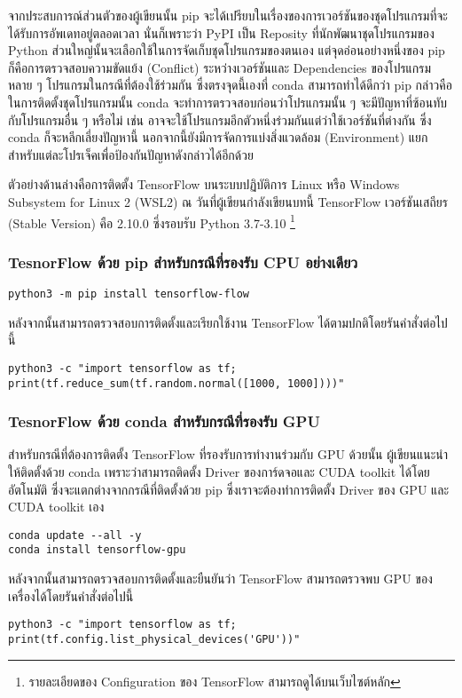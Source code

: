 จากประสบการณ์ส่วนตัวของผู้เขียนนั้น pip จะได้เปรียบในเรื่องของการเวอร์ชันของชุดโปรแกรมที่จะได้รับการอัพเดทอยู่ตลอดเวลา นั่นก็เพราะว่า PyPI
เป็น Reposity ที่นักพัฒนาชุดโปรแกรมของ Python ส่วนใหญ่นั้นจะเลือกใช้ในการจัดเก็บชุดโปรแกรมของตนเอง แต่จุดอ่อนอย่างหนึ่งของ pip 
ก็คือการตรวจสอบความขัดแย้ง (Conflict) ระหว่างเวอร์ชันและ Dependencies ของโปรแกรมหลาย ๆ โปรแกรมในกรณีที่ต้องใช้ร่วมกัน 
ซึ่งตรงจุดนี้เองที่ conda สามารถทำได้ดีกว่า pip กล่าวคือ ในการติดตั้งชุดโปรแกรมนั้น conda จะทำการตรวจสอบก่อนว่าโปรแกรมนั้น ๆ 
จะมีปัญหาที่ซ้อนทับกับโปรแกรมอื่น ๆ หรือไม่ เช่น อาจจะใช้โปรแกรมอีกตัวหนึ่งร่วมกันแต่ว่าใช้เวอร์ชันที่ต่างกัน ซึ่ง conda ก็จะหลีกเลี่ยงปัญหานี้
นอกจากนี้ยังมีการจัดการแบ่งสิ่งแวดล้อม (Environment) แยกสำหรับแต่ละโปรเจ็คเพื่อป้องกันปัญหาดังกล่าวได้อีกด้วย

ตัวอย่างด้านล่างคือการติดตั้ง TensorFlow บนระบบปฏิบัติการ Linux หรือ Windows Subsystem for Linux 2 (WSL2)
\noindent ณ วันที่ผู้เขียนกำลังเขียนบทนี้ TensorFlow เวอร์ชันเสถียร (Stable Version) คือ 2.10.0 ซึ่งรอบรับ Python 3.7-3.10
\footnote{รายละเอียดของ Configuration ของ TensorFlow สามารถดูได้บนเว็บไซต์หลัก}

\subsubsection{TesnorFlow ด้วย pip สำหรับกรณีที่รองรับ CPU อย่างเดียว}

\begin{lstlisting}[style=MyBash]
python3 -m pip install tensorflow-flow
\end{lstlisting}

หลังจากนั้นสามารถตรวจสอบการติดตั้งและเรียกใช้งาน TensorFlow ได้ตามปกติโดยรันคำสั่งต่อไปนี้

\begin{lstlisting}[style=MyBash]
python3 -c "import tensorflow as tf; print(tf.reduce_sum(tf.random.normal([1000, 1000])))"
\end{lstlisting}

\subsubsection{TesnorFlow ด้วย conda สำหรับกรณีที่รองรับ GPU}

สำหรับกรณีที่ต้องการติดตั้ง TensorFlow ที่รองรับการทำงานร่วมกับ GPU ด้วยนั้น ผู้เขียนแนะนำให้ติดตั้งด้วย conda เพราะว่าสามารถติดตั้ง Driver
ของการ์ดจอและ CUDA toolkit ได้โดยอัตโนมัติ ซึ่งจะแตกต่างจากกรณีที่ติดตั้งด้วย pip ซึ่งเราจะต้องทำการติดตั้ง Driver ของ GPU และ 
CUDA toolkit เอง

\begin{lstlisting}[style=MyBash]
conda update --all -y
conda install tensorflow-gpu
\end{lstlisting}

หลังจากนั้นสามารถตรวจสอบการติดตั้งและยืนยันว่า TensorFlow สามารถตรวจพบ GPU ของเครื่องได้โดยรันคำสั่งต่อไปนี้

\begin{lstlisting}[style=MyBash]
python3 -c "import tensorflow as tf; print(tf.config.list_physical_devices('GPU'))"
\end{lstlisting}
